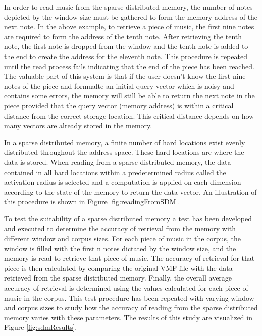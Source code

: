 In order to read music from the sparse distributed memory, the number of notes depicted by the window size must be gathered to form the memory address of the next note. In the above example, to retrieve a piece of music, the first nine notes are required to form the address of the tenth note. After retrieving the tenth note, the first note is dropped from the window and the tenth note is added to the end to create the address for the eleventh note. This procedure is repeated until the read process fails indicating that the end of the piece has been reached. The valuable part of this system is that if the user doesn't know the first nine notes of the piece and formualte an initial query vector which is noisy and contains some errors, the memory will still be able to return the next note in the piece provided that the query vector (memory address) is within a critical distance from the correct storage location. This critical distance depends on how many vectors are already stored in the memory.

In a sparse distributed memory, a finite number of hard locations exist evenly distributed throughout the address space. These hard locations are where the data is stored. When reading from a sparse distributed memory, the data contained in all hard locations within a predetermined radius called the activation radius is selected and a computation is applied on each dimension according to the state of the memory to return the data vector. An illustration of this procedure is shown in Figure \ref{fig:readingFromSDM}.

To test the suitability of a sparse distributed memory a test has been developed and executed to determine the accuracy of retrieval from the memory with different window and corpus sizes. For each piece of music in the corpus, the window is filled with the first n notes dictated by the window size, and the memory is read to retrieve that piece of music. The accuracy of retrieval for that piece is then calculated by comparing the original VMF file with the data retrieved from the sparse distributed memory. Finally, the overall average accuracy of retrieval is determined using the values calculated for each piece of music in the corpus. This test procedure has been repeated with varying window and corpus sizes to study how the accuracy of reading from the sparse distributed memory varies with these parameters. The results of this study are visualized in Figure \ref{fig:sdmResults}.

